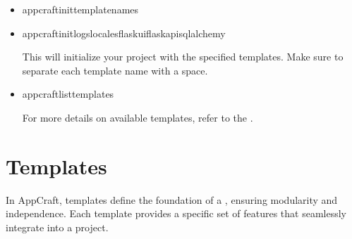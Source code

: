 \documentclass[letterpaper,10pt,english]{sphinxhowto}
\begin{document}
\begin{itemize}
\item {} \begin{description}
\begin{sphinxVerbatim}[commandchars=\\\{\}]
appcraftinit\PYGZlt{}template\PYGZus{}names\PYGZgt{}
\end{sphinxVerbatim}

\end{description}

\item {} \begin{description}
\begin{sphinxVerbatim}[commandchars=\\\{\}]
appcraftinitlogslocalesflask\PYGZus{}uiflask\PYGZus{}apisqlalchemy
\end{sphinxVerbatim}

\sphinxAtStartPar
This will initialize your project with the specified templates. Make sure to separate each template name with a space.

\end{description}

\item {} \begin{description}
\begin{sphinxVerbatim}[commandchars=\\\{\}]
appcraftlist\PYGZus{}templates
\end{sphinxVerbatim}

\sphinxAtStartPar
For more details on available templates, refer to the .

\end{description}

\end{itemize}

\sphinxstepscope


\section{Templates}
\label{\detokenize{templates/index:templates}}\label{\detokenize{templates/index::doc}}
\sphinxAtStartPar
In AppCraft, templates define the foundation of a , ensuring modularity and independence. Each template provides a specific set of features that seamlessly integrate into a project.
\end{document}
